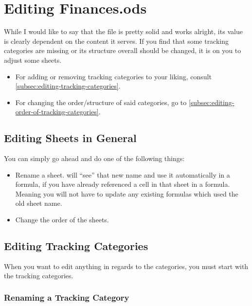\section{Editing Finances.ods}
\label{sec:editing-finances.ods}

While I would like to say that the file is pretty solid and works alright, its value is clearly dependent on the content it serves.
If you find that some tracking categories are missing or its structure overall should be changed, it is on you to adjust some sheets.
\begin{itemize}
	\item For adding or removing tracking categories to your liking, consult \autoref{subsec:editing-tracking-categories}.
	\item For changing the order/structure of said categories, go to \autoref{subsec:editing-order-of-tracking-categories}.
\end{itemize}

\subsection{Editing Sheets in General}
\label{subsec:editing-sheet-in-general}

You can simply go ahead and do one of the following things:
\begin{itemize}
	\item Rename a sheet.
	\loc will ``see'' that new name and use it automatically in a formula, if you have already referenced a cell in that sheet in a formula.
	Meaning you will not have to update any existing formulas which used the old sheet name.
	\item Change the order of the sheets.
\end{itemize}

\subsection{Editing Tracking Categories}
\label{subsec:editing-tracking-categories}

When you want to edit anything in regards to the categories, you must start with the tracking categories.

\subsubsection{Renaming a Tracking Category}
\label{subsubsec:renaming-a-tracking-category}

